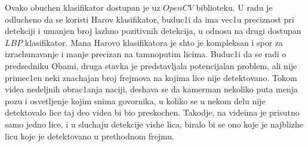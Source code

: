 \documentclass[a4paper, openany, oneside, 11pt]{book}
\begin{document}
Ovako obuchen klasifikator dostupan je uz $OpenCV$ biblioteku. U radu je odlucheno da se koristi Harov klasifikator, buduc1i da ima vec1u preciznost pri detekciji i umanjen broj lazhno pozitivnih detekcija, u odnosu na drugi dostupan $LBP$ klasifikator. Mana Harovo klasifikatora je shto je kompleksan i spor za izrachunavanje i manje precizan na tamnoputim licima. Buduc1i da se radi o predsedniku Obami, druga stavka je predstavljala potencijalan problem, ali nije primec1en neki znachajan broj frejmova na kojima lice nije detektovano. Tokom videa nedeljnih obrac1anja naciji, deshava se da kamerman nekoliko puta menja pozu i osvetljenje kojim snima govornika, u koliko se u nekom delu nije detektovalo lice taj deo videa bi bio preskochen. Takodje, na videima je prisutno samo jedno lice, i u sluchaju detekcije vishe lica, biralo bi se ono koje je najblizhe licu koje je detektovano u prethodnom frejmu.
\end{document}
